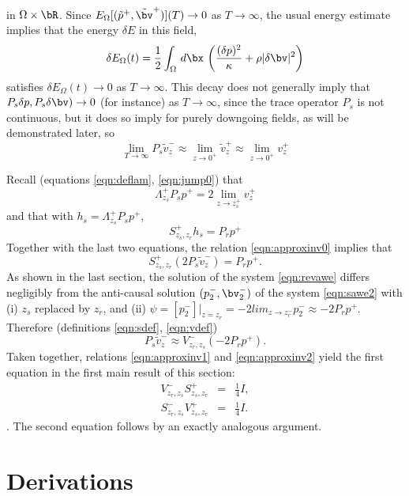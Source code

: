 in $\Omega \times \bR$. Since
$E_{\Omega}[(\tilde{p}^+,\tilde{\bv}^+)](T) \rightarrow 0$ as $T
\rightarrow \infty$, the usual energy estimate implies that the energy $\delta
E$ in this field,
\[
  \delta E_{\Omega}(t) = \frac{1}{2} \int_{\Omega} \,d\bx \,
 \left(\frac{(\delta p)^2}{\kappa} + \rho |\delta \bv|^2\right)
\]
satisfies $\delta E_{\Omega}(t) \rightarrow 0$ as $T \rightarrow
\infty$. This decay does not generally imply that $P_s\delta p, P_s \delta \bv)
\rightarrow 0$ (for instance) as $T \rightarrow \infty$, since the trace operator
$P_s$ is not continuous, but it does so imply for purely downgoing
fields, as will be demonstrated later, so
\begin{equation}
  \label{eqn:approxinv0}
  \lim_{T \rightarrow \infty} P_s\tilde{v}_z^- \approx \lim_{z \rightarrow
    0^+}\tilde{v}_z^+ \approx \lim_{z \rightarrow 0^+}v^+_z
\end{equation}
  
Recall (equations \ref{eqn:deflam}, \ref{eqn:jump0}) that
\[
  \Lambda^+_{z_s} P_s p^+ = 2 \lim_{z \rightarrow z_s^+}v^+_z 
\]
and that with $h_s= \Lambda^+_{z_s}P_sp^+$,
\[
  S^+_{z_s,z_r}h_s = P_r p^+
\]
Together with the last two equations, the relation
\ref{eqn:approxinv0} implies that
\begin{equation}
  \label{eqn:approxinv1}
  S^+_{z_s,z_r}(2 P_s \tilde{v}_z^-) = P_rp^+.
\end{equation}
As shown in the last section, the solution of the system
\ref{eqn:revawe} differs negligibly from the anti-causal solution $(p^-_2,\bv^-_2)$
of the system \ref{eqn:sawe2} with (i) $z_s$ replaced by $z_r$, and
(ii) $\psi = [p^-_2]|_{z=z_r} = -2 lim_{z \rightarrow z_r^-} p^-_2
\approx -2 P_rp^+$. Therefore (definitions \ref{eqn:sdef}, \ref{eqn:vdef})
\begin{equation}
  \label{eqn:approxinv2}
  P_s \tilde{v}_z^- \approx V^-_{z_r,z_s}(-2 P_rp^+).
\end{equation}
Taken together, relations \ref{eqn:approxinv1} and
\ref{eqn:approxinv2} yield the first equation in the first main result of this section:
\begin{eqnarray}
  \label{eqn:approxinv}
  V^-_{z_r,z_s} S^+_{z_s,z_r} &=& \frac{1}{4}I, \nonumber\\
  S^-_{z_r,z_s} V^+_{z_s,z_r} &=& \frac{1}{4}I.
\end{eqnarray}.
The second equation follows by an exactly analogous argument.


\section{Derivations}

